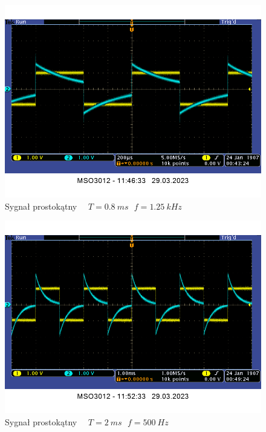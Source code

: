 \documentclass[14pt, table]{extarticle}
\begin{document}
\begin{figure}[H]
\includegraphics[scale=0.65]{CR-square-0_8ms}
\centering
\captionsetup{labelformat=empty}
\caption{Sygnał prostokątny \ \ $T = 0.8 \ ms \ \ \ f = 1.25 \ kHz$}
\end{figure}

\begin{figure}[H]
\includegraphics[scale=0.65]{CR-square-2ms}
\centering
\captionsetup{labelformat=empty}
\caption{Sygnał prostokątny \ \ $T = 2 \ ms \ \ \ f = 500 \ Hz$}
\end{figure}
\end{document}
